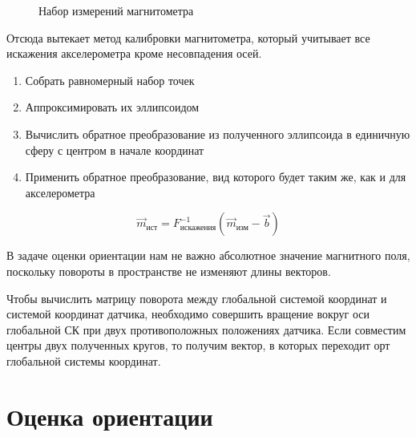 \documentclass[12pt,a4paper]{article}
\begin{document}
\begin{figure}[h!]
	\caption{Набор измерений магнитометра}
	\label{fig:compass_points}
\end{figure}

Отсюда вытекает метод калибровки магнитометра, который учитывает все искажения акселерометра кроме несовпадения осей. 

\begin{enumerate}
	\item Собрать равномерный набор точек
	\item Аппроксимировать их эллипсоидом
	\item Вычислить обратное преобразование из полученного эллипсоида в единичную сферу с центром в начале координат
	\item Применить обратное преобразование, вид которого будет таким же, как и для акселерометра
\end{enumerate}

$$ \vec{m}_{\text{ист}} = F_{\text{искажения}}^{-1}(\vec{m}_{\text{изм}} - \vec{b}) $$

В задаче оценки ориентации нам не важно абсолютное значение магнитного поля, поскольку повороты в пространстве не изменяют длины векторов.

Чтобы вычислить матрицу поворота между глобальной системой координат и системой координат датчика, необходимо совершить вращение вокруг оси глобальной СК при двух противоположных положениях датчика. Если совместим центры двух полученных кругов, то получим вектор, в которых переходит орт глобальной системы координат.

\section{Оценка ориентации}
\end{document}
